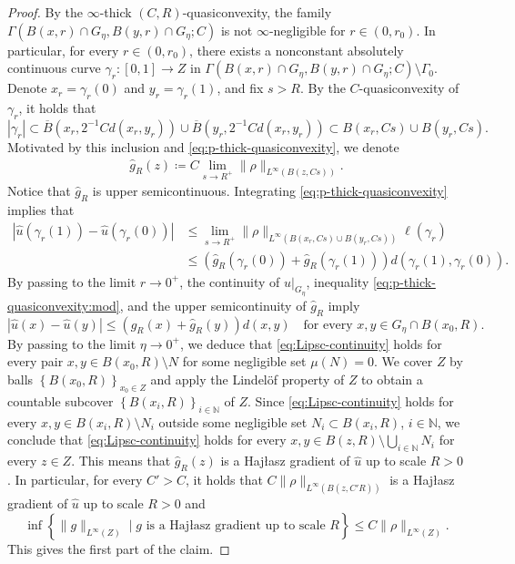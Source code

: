 \documentclass[reqno]{amsart}
\numberwithin{equation}{section}
\theoremstyle{remark}
\begin{document}
\begin{proof}
By the $\infty$-thick $(C,R)$-quasiconvexity, the family $\Gamma( B( x, r ) \cap G_{\eta}, B( y, r ) \cap G_{\eta}; C )$ is not $\infty$-negligible for $r \in (0,r_0)$. In particular, for every $r\in (0,r_0)$, there exists a nonconstant absolutely continuous curve $\gamma_r \colon [0,1] \rightarrow Z$ in $\Gamma( B( x, r ) \cap G_{\eta}, B(y, r ) \cap G_{\eta}; C )\setminus\Gamma_0$. Denote $x_r = \gamma_r(0)$ and $y_r = \gamma_r(1)$, and fix $s > R$. By the $C$-quasiconvexity of $\gamma_r$, it holds that
$$|\gamma_r| \subset \overline{B}( x_r, 2^{-1}Cd(x_r,y_r) ) \cup \overline{B}( y_r, 2^{-1}Cd(x_r,y_r)) \subset B( x_r, C s) \cup B( y_r, Cs ).$$
Motivated by this inclusion and \eqref{eq:p-thick-quasiconvexity}, we denote
\begin{align*}
    \widehat{g}_{R}(z) \coloneqq C\lim_{ s \rightarrow R^{+} }\| \rho \|_{ L^{\infty}( B( z, Cs) ) }.
\end{align*}
Notice that $\widehat{g}_{R}$ is upper semicontinuous. Integrating \eqref{eq:p-thick-quasiconvexity} implies that
\begin{align}\label{eq:p-thick-quasiconvexity:mod}
    | \widehat{u}( \gamma_r(1) ) - \widehat{u}( \gamma_r(0) ) |
    &\leq 
    \lim_{ s \rightarrow R^{+} }
    \|\rho\|_{L^{\infty}(B(x_r,Cs)\cup B(y_r,Cs))}\ell(\gamma_r) \nonumber\\
    &\leq 
    ( \widehat{g}_{R}( \gamma_r(0) ) + \widehat{g}_{R}( \gamma_r(1)) )
    d( \gamma_r(1), \gamma_r(0) ).
\end{align}
By passing to the limit $r \rightarrow 0^{+}$, the continuity of $\widehat{u}|_{ G_\eta }$, inequality \eqref{eq:p-thick-quasiconvexity:mod}, and the upper semicontinuity of $\widehat{g}_{R}$ imply 
\begin{equation}\label{eq:Lipsc-continuity}
    | \widehat{u}( x) - \widehat{u}(y ) |
    \leq
    ( \widehat{g}_{R}( x ) + \widehat{g}_{R}( y ) )d( x, y )
    \quad\text{for every $x, y \in G_{\eta} \cap B( x_0, R )$.}
\end{equation}
By passing to the limit $\eta \rightarrow 0^{+}$, we deduce that \eqref{eq:Lipsc-continuity} holds for every pair $x, y \in B( x_0, R ) \setminus N$ for some negligible set $\mu( N ) = 0$. We cover $Z$ by balls $\left\{ B( x_{0}, R ) \right\}_{ x_0 \in Z }$ and apply the Lindelöf property of $Z$ to obtain a countable subcover $\left\{ B( x_i, R ) \right\}_{ i \in \mathbb{N} }$ of $Z$. Since \eqref{eq:Lipsc-continuity} holds for every $x,y \in B( x_i, R ) \setminus N_i$ outside some negligible set $N_i \subset B( x_i, R )$, $i \in \mathbb{N}$, we conclude that \eqref{eq:Lipsc-continuity} holds for every $x, y \in B( z, R ) \setminus \bigcup_{ i \in \mathbb{N} } N_i$ for every $z \in Z$. This means that  $\widehat{g}_{R}(z)$ is a Haj{\l}asz gradient of $\widehat u$ up to scale $R>0$. In particular, for every $C'>C$, it holds that $C\|\rho\|_{L^{\infty}(B(z, C'R))}$ is a Haj{\l}asz gradient of $\widehat u$ up to scale $R>0$ and
\begin{equation*}
    \inf\left\{ \| g \|_{ L^{\infty}(Z) } \mid \text{$g$ is a Haj\l{}asz gradient up to scale $R$} \right\}
    \leq
    C \| \rho \|_{ L^{\infty}(Z) }.
\end{equation*}
This gives the first part of the claim.


\end{proof}
\end{document}
